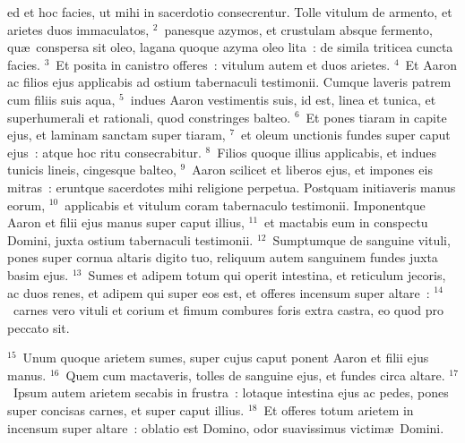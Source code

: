 \bchapter
{}ed et hoc facies, ut mihi in sacerdotio consecrentur. Tolle vitulum de armento, et arietes duos immaculatos,
${}^{2}$~panesque azymos, et crustulam absque fermento, qu\ae\ conspersa sit oleo, lagana quoque azyma oleo lita~: de simila triticea cuncta facies.
${}^{3}$~Et posita in canistro offeres~: vitulum autem et duos arietes.
${}^{4}$~Et Aaron ac filios ejus applicabis ad ostium tabernaculi testimonii. Cumque laveris patrem cum filiis suis aqua,
${}^{5}$~indues Aaron vestimentis suis, id est, linea et tunica, et superhumerali et rationali, quod constringes balteo.
${}^{6}$~Et pones tiaram in capite ejus, et laminam sanctam super tiaram,
${}^{7}$~et oleum unctionis fundes super caput ejus~: atque hoc ritu consecrabitur.
${}^{8}$~Filios quoque illius applicabis, et indues tunicis lineis, cingesque balteo,
${}^{9}$~Aaron scilicet et liberos ejus, et impones eis mitras~: eruntque sacerdotes mihi religione perpetua. Postquam initiaveris manus eorum,
${}^{10}$~applicabis et vitulum coram tabernaculo testimonii. Imponentque Aaron et filii ejus manus super caput illius,
${}^{11}$~et mactabis eum in conspectu Domini, juxta ostium tabernaculi testimonii.
${}^{12}$~Sumptumque de sanguine vituli, pones super cornua altaris digito tuo, reliquum autem sanguinem fundes juxta basim ejus.
${}^{13}$~Sumes et adipem totum qui operit intestina, et reticulum jecoris, ac duos renes, et adipem qui super eos est, et offeres incensum super altare~:
${}^{14}$~carnes vero vituli et corium et fimum combures foris extra castra, eo quod pro peccato sit.


${}^{15}$~Unum quoque arietem sumes, super cujus caput ponent Aaron et filii ejus manus.
${}^{16}$~Quem cum mactaveris, tolles de sanguine ejus, et fundes circa altare.
${}^{17}$~Ipsum autem arietem secabis in frustra~: lotaque intestina ejus ac pedes, pones super concisas carnes, et super caput illius.
${}^{18}$~Et offeres totum arietem in incensum super altare~: oblatio est Domino, odor suavissimus victim\ae\ Domini.


